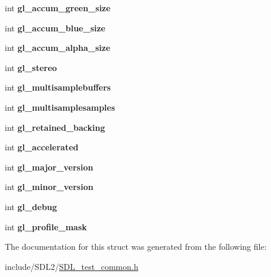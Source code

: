 \begin{DoxyCompactItemize}
\item 
\mbox{\label{struct_s_d_l_test___common_state_a4c20729a710f51ed67bdd1910da1a16b}} 
int {\bfseries gl\+\_\+accum\+\_\+green\+\_\+size}
\item 
\mbox{\label{struct_s_d_l_test___common_state_a3d23ac90e722af5098e7869a7302c119}} 
int {\bfseries gl\+\_\+accum\+\_\+blue\+\_\+size}
\item 
\mbox{\label{struct_s_d_l_test___common_state_ab6dddf75a40c53343199fe724a2af32b}} 
int {\bfseries gl\+\_\+accum\+\_\+alpha\+\_\+size}
\item 
\mbox{\label{struct_s_d_l_test___common_state_a39177b165c6a9c2164937c82402e2d4f}} 
int {\bfseries gl\+\_\+stereo}
\item 
\mbox{\label{struct_s_d_l_test___common_state_a083f7381809b23f0ac3a9a8de562f70c}} 
int {\bfseries gl\+\_\+multisamplebuffers}
\item 
\mbox{\label{struct_s_d_l_test___common_state_a96718b47862d4962e4a7ae9a62ce4a30}} 
int {\bfseries gl\+\_\+multisamplesamples}
\item 
\mbox{\label{struct_s_d_l_test___common_state_a5fa59e7aa6210fcde02940536eea9c12}} 
int {\bfseries gl\+\_\+retained\+\_\+backing}
\item 
\mbox{\label{struct_s_d_l_test___common_state_a2dca523be403a9ff6fe2dd7b1808baba}} 
int {\bfseries gl\+\_\+accelerated}
\item 
\mbox{\label{struct_s_d_l_test___common_state_a766e471516e0a39d0bb8c14ea2042bdf}} 
int {\bfseries gl\+\_\+major\+\_\+version}
\item 
\mbox{\label{struct_s_d_l_test___common_state_a5a50c65004454c791da21a3473388608}} 
int {\bfseries gl\+\_\+minor\+\_\+version}
\item 
\mbox{\label{struct_s_d_l_test___common_state_a2710657ef2a0c8aabebc5fceb01c71b5}} 
int {\bfseries gl\+\_\+debug}
\item 
\mbox{\label{struct_s_d_l_test___common_state_aa923ff5f227c35523a4e491863a7d907}} 
int {\bfseries gl\+\_\+profile\+\_\+mask}
\end{DoxyCompactItemize}


The documentation for this struct was generated from the following file\+:\begin{DoxyCompactItemize}
\item 
include/\+S\+D\+L2/\hyperlink{_s_d_l__test__common_8h}{S\+D\+L\+\_\+test\+\_\+common.\+h}\end{DoxyCompactItemize}
